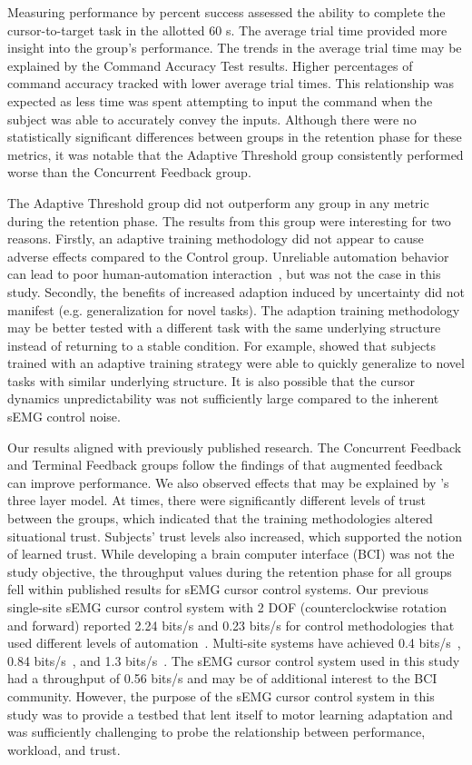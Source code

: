 Measuring performance by percent success assessed the ability to complete the cursor-to-target task in the allotted 60 s.
The average trial time provided more insight into the group's performance.
The trends in the average trial time may be explained by the Command Accuracy Test results.
Higher percentages of command accuracy tracked with lower average trial times.
This relationship was expected as less time was spent attempting to input the command when the subject was able to accurately convey the inputs.
Although there were no statistically significant differences between groups in the retention phase for these metrics, it was notable that the Adaptive Threshold group consistently performed worse than the Concurrent Feedback group.

The Adaptive Threshold group did not outperform any group in any metric during the retention phase.
The results from this group were interesting for two reasons.
Firstly, an adaptive training methodology did not appear to cause adverse effects compared to the Control group.
Unreliable automation behavior can lead to poor human-automation interaction~\citep{RN54}, but was not the case in this study.
Secondly, the benefits of increased adaption induced by uncertainty did not manifest (e.g. generalization for novel tasks).
The adaption training methodology may be better tested with a different task with the same underlying structure instead of returning to a stable condition.
For example, \citeauthor{RN36} showed that subjects trained with an adaptive training strategy were able to quickly generalize to novel tasks with similar underlying structure.
It is also possible that the cursor dynamics unpredictability was not sufficiently large compared to the inherent sEMG control noise.

Our results aligned with previously published research.
The Concurrent Feedback and Terminal Feedback groups follow the findings of \citeauthor{RN27} that augmented feedback can improve performance.
We also observed effects that may be explained by \citeauthor{RN39}'s three layer model.
At times, there were significantly different levels of trust between the groups, which indicated that the training methodologies altered situational trust.
Subjects' trust levels also increased, which supported the notion of learned trust.
While developing a brain computer interface (BCI) was not the study objective, the throughput values during the retention phase for all groups fell within published results for sEMG cursor control systems.
Our previous single-site sEMG cursor control system with 2 DOF (counterclockwise rotation and forward) reported 2.24 bits/s and 0.23 bits/s for control methodologies that used different levels of automation~\citep{RN45}.
Multi-site systems have achieved 0.4 bits/s~\citep{RN57}, 0.84 bits/s~\citep{RN55}, and 1.3 bits/s~\citep{RN56}.
The sEMG cursor control system used in this study had a throughput of 0.56 bits/s and may be of additional interest to the BCI community.
However, the purpose of the sEMG cursor control system in this study was to provide a testbed that lent itself to motor learning adaptation and was sufficiently challenging to probe the relationship between performance, workload, and trust.

